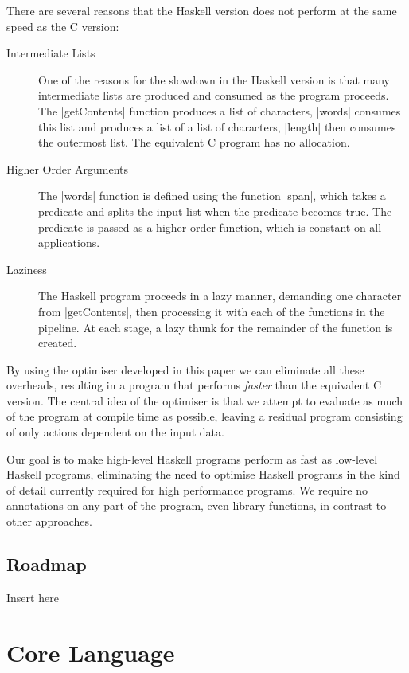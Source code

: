 \documentclass{llncs}
\begin{document}
There are several reasons that the Haskell version does not perform at the same speed as the C version:

\begin{description}
\item[Intermediate Lists] One of the reasons for the slowdown in the Haskell version is that many intermediate lists are produced and consumed as the program proceeds. The |getContents| function produces a list of characters, |words| consumes this list and produces a list of a list of characters, |length| then consumes the outermost list. The equivalent C program has no allocation.
\item[Higher Order Arguments] The |words| function is defined using the function |span|, which takes a predicate and splits the input list when the predicate becomes true. The predicate is passed as a higher order function, which is constant on all applications.
\item[Laziness] The Haskell program proceeds in a lazy manner, demanding one character from |getContents|, then processing it with each of the functions in the pipeline. At each stage, a lazy thunk for the remainder of the function is created.
\end{description}

By using the optimiser developed in this paper we can eliminate all these overheads, resulting in a program that performs \textit{faster} than the equivalent C version. The central idea of the optimiser is that we attempt to evaluate as much of the program at compile time as possible, leaving a residual program consisting of only actions dependent on the input data.

Our goal is to make high-level Haskell programs perform as fast as low-level Haskell programs, eliminating the need to optimise Haskell programs in the kind of detail currently required for high performance programs. We require no annotations on any part of the program, even library functions, in contrast to other approaches.

\subsection{Roadmap}

Insert here

\section{Core Language}
\end{document}
